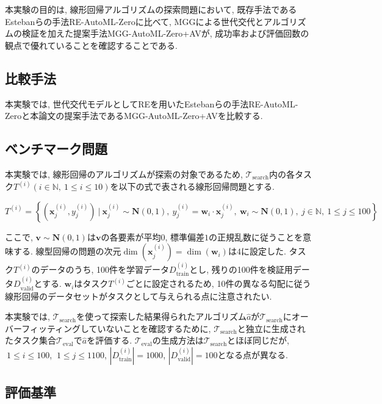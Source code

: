\documentclass[11pt,oneside,openany,report]{jsbook}
\begin{document}
本実験の目的は, 線形回帰アルゴリズムの探索問題において, 既存手法であるEstebanらの手法RE-AutoML-Zeroに比べて, MGGによる世代交代とアルゴリズムの検証を加えた提案手法MGG-AutoML-Zero+AVが, 成功率および評価回数の観点で優れていることを確認することである.

\subsection{比較手法}\label{mgg_automl_zero_av:exp:comparison}

本実験では, 世代交代モデルとしてREを用いたEstebanらの手法RE-AutoML-Zeroと本論文の提案手法であるMGG-AutoML-Zero+AVを比較する.

\subsection{ベンチマーク問題}\label{mgg_automl_zero_av:exp:problem}

本実験では, 線形回帰のアルゴリズムが探索の対象であるため, $\mathcal{T}_\mathrm{search}$内の各タスク$T^{(i)}(i \in \mathbb{N},\ 1 \le i \le 10)$を以下の式で表される線形回帰問題とする.

$$
  T^{(i)} = \left\{(\bm{x}^{(i)}_j, y^{(i)}_j) \ |\ \bm{x}^{(i)}_j \sim \bm{N}(0, 1),\ y^{(i)}_j = \bm{w}_i \cdot \bm{x}^{(i)}_j,\ \bm{w}_i \sim \bm{N}(0, 1),\ j \in \mathbb{N},\ 1 \le j \le 100 \right\}
$$

\noindent
ここで, $\bm{v} \sim \bm{N}(0, 1)$は$\bm{v}$の各要素が平均$0$, 標準偏差$1$の正規乱数に従うことを意味する. 線型回帰の問題の次元$\dim(\bm{x}^{(i)}_j) = \dim(\bm{w}_i)$は$4$に設定した. タスク$T^{(i)}$のデータのうち, 100件を学習データ$D^{(i)}_\mathrm{train}$とし, 残りの100件を検証用データ$D^{(i)}_\mathrm{valid}$とする. $\bm{w}_i$はタスク$T^{(i)}$ごとに設定されるため, 10件の異なる勾配に従う線形回帰のデータセットがタスクとして与えられる点に注意されたい.

本実験では, $\mathcal{T}_\mathrm{search}$を使って探索した結果得られたアルゴリズム$\hat{a}$が$\mathcal{T}_\mathrm{search}$にオーバーフィッティングしていないことを確認するために, $\mathcal{T}_\mathrm{search}$と独立に生成されたタスク集合$\mathcal{T}_\mathrm{eval}$で$\hat{a}$を評価する. $\mathcal{T}_\mathrm{eval}$の生成方法は$\mathcal{T}_\mathrm{search}$とほぼ同じだが, $\ 1 \le i \le 100$, $\ 1 \le j \le 1100$, $\left| D^{(i)}_\mathrm{train} \right| = 1000$, $\left| D^{(i)}_\mathrm{valid} \right| = 100$となる点が異なる.


\subsection{評価基準}\label{mgg_automl_zero_av:exp:eval}
\end{document}
